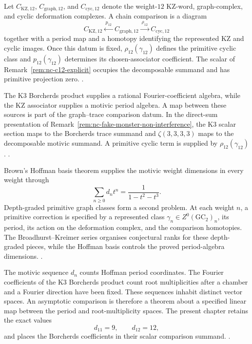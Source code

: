\begin{remark}
\label{rem:nc-kz-depth-4-integral}
Let \(C_{\mathrm{KZ},12}\), \(C_{\mathrm{graph},12}\), and
\(C_{\mathrm{cyc},12}\) denote the weight-$12$ KZ-word,
graph-complex, and cyclic deformation complexes.  A chain comparison
is a diagram
\[
 C_{\mathrm{KZ},12}
 \xleftarrow{\ p_{12}\ }
 C_{\mathrm{graph},12}
 \xrightarrow{\ \rho_{12}\ }
 C_{\mathrm{cyc},12}
\]
together with a period map and a homotopy identifying the represented
KZ and cyclic images.  Once this datum is fixed,
\(\rho_{12}(\gamma_{12})\) defines the primitive cyclic class and
\(p_{12}(\gamma_{12})\) determines its chosen-associator coefficient.
The scalar of Remark~\ref{rem:nc-c12-explicit} occupies the
decomposable summand and has primitive projection zero.
\cite{Drinfeld1990,Willwacher2015,Brown2012}.
\end{remark}

\begin{remark}
\label{rem:nc-fake-monster-fourier-check}
The K3 Borcherds product supplies a rational Fourier-coefficient
algebra, while the KZ associator supplies a motivic period algebra.
A map between these sources is part of the graph--trace comparison
datum.  In the direct-sum presentation of
Remark~\ref{rem:nc-fake-monster-non-interference}, the K3 scalar
section maps to the Borcherds trace summand and
\(\zeta(3,3,3,3)\) maps to the decomposable motivic summand.
A primitive cyclic term is supplied by
\(\rho_{12}(\gamma_{12})\).
\cite{Borcherds1998,GritsenkoNikulin1998,Brown2011}.
\end{remark}

\begin{remark}
\label{rem:nc-open-horizon}
Brown's Hoffman basis theorem supplies the motivic weight dimensions
in every weight through
\[
 \sum_{n\geq0}d_nt^n=\frac{1}{1-t^2-t^3}.
\]
Depth-graded primitive graph classes form a second problem.  At each
weight \(n\), a primitive correction is specified by a represented
class \(\gamma_n\in Z^0(\mathrm{GC}_2)_n\), its period, its action on
the deformation complex, and the comparison homotopies.  The
Broadhurst--Kreimer series organises conjectural ranks for these
depth-graded pieces, while the Hoffman basis controls the proved
period-algebra dimensions.
\cite{Brown2011,Brown2012,BroadhurstKreimer1997}.
\end{remark}

\begin{remark}
\label{rem:nc-asymptotic-11-12}
The motivic sequence \(d_n\) counts Hoffman period coordinates.  The
Fourier coefficients of the K3 Borcherds product count root
multiplicities after a chamber and a Fourier direction have been
fixed.  These sequences inhabit distinct vector spaces.  An
asymptotic comparison is therefore a theorem about a specified linear
map between the period and root-multiplicity spaces.  The present
chapter retains the exact values
\[
 d_{11}=9,\qquad d_{12}=12,
\]
and places the Borcherds coefficients in their scalar comparison
summand.
\cite{Brown2011,GritsenkoNikulin1998}.
\end{remark}


